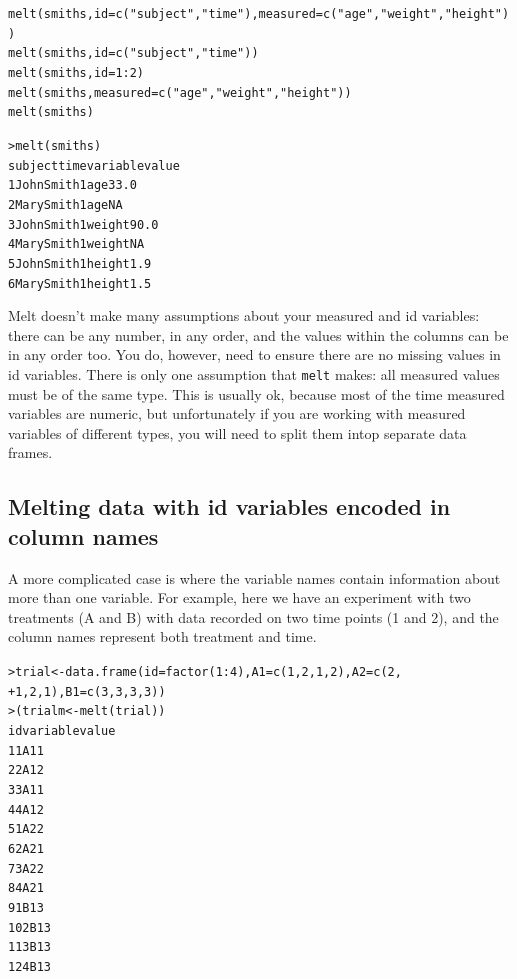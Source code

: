 \documentclass[oneside,letterpaper]{scrartcl}
\begin{document}
\begin{alltt}
melt(smiths, id=c("subject","time"), measured=c("age","weight","height"))
melt(smiths, id=c("subject","time"))
melt(smiths, id=1:2)
melt(smiths, measured=c("age","weight","height"))
melt(smiths)
\end{alltt}

\begin{alltt}
> melt(smiths)
     subject time variable value
1 John Smith    1      age  33.0
2 Mary Smith    1      age    NA
3 John Smith    1   weight  90.0
4 Mary Smith    1   weight    NA
5 John Smith    1   height   1.9
6 Mary Smith    1   height   1.5

\end{alltt}

Melt doesn't make many assumptions about your measured and id variables: there can be any number, in any order, and the values within the columns can be in any order too.  You do, however, need to ensure there are no missing values in id variables.  There is only one assumption that {\tt melt} makes: all measured values must be of the same type.  This is usually ok, because most of the time measured variables are numeric, but unfortunately if you are working with measured variables of different types, you will need to split them intop separate data frames.

\subsection{Melting data with id variables encoded in column names}\label{sub:multiple-identifiers}

A more complicated case is where the variable names contain information about more than one variable.  For example, here we have an experiment with two treatments (A and B) with data recorded on two time points (1 and 2), and the column names represent both treatment and time.

\begin{alltt}
> trial <- data.frame(id = factor(1:4), A1 = c(1, 2, 1, 2), A2 = c(2, 
+     1, 2, 1), B1 = c(3, 3, 3, 3))
> (trialm <- melt(trial))
   id variable value
1   1       A1     1
2   2       A1     2
3   3       A1     1
4   4       A1     2
5   1       A2     2
6   2       A2     1
7   3       A2     2
8   4       A2     1
9   1       B1     3
10  2       B1     3
11  3       B1     3
12  4       B1     3

\end{alltt}
\end{document}
